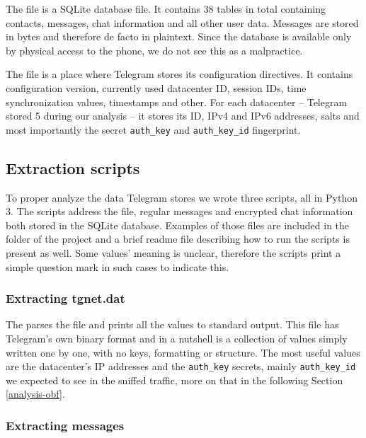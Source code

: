\documentclass[thesis=M,english]{FITthesis}[2012/10/20]
\begin{document}
The  file is a SQLite database file. It contains 38 tables in total containing contacts, messages, chat information and all other user data. Messages are stored in bytes and therefore de facto in plaintext. Since the database is available only by physical access to the phone, we do not see this as a malpractice.

The  file is a place where Telegram stores its configuration directives. It contains configuration version, currently used datacenter ID, session IDs, time synchronization values, timestamps and other. For each datacenter -- Telegram stored 5 during our analysis -- it stores its ID, IPv4 and IPv6 addresses, salts and most importantly the secret \texttt{auth\_key} and \texttt{auth\_key\_id} fingerprint.

\subsection{Extraction scripts}

To proper analyze the data Telegram stores we wrote three scripts, all in Python 3. The scripts address the  file, regular messages and encrypted chat information both stored in the SQLite database. Examples of those files are included in the  folder of the project and a brief readme file describing how to run the scripts is present as well. Some values' meaning is unclear, therefore the scripts print a simple question mark in such cases to indicate this.

\subsubsection{Extracting tgnet.dat}

The  parses the  file and prints all the values to standard output. This file has Telegram's own binary format and in a nutshell is a collection of values simply written one by one, with no keys, formatting or structure. The most useful values are the datacenter's IP addresses and the \texttt{auth\_key} secrets, mainly \texttt{auth\_key\_id} we expected to see in the sniffed traffic, more on that in the following Section \ref{analysis-obf}.

\subsubsection{Extracting messages}
\end{document}
